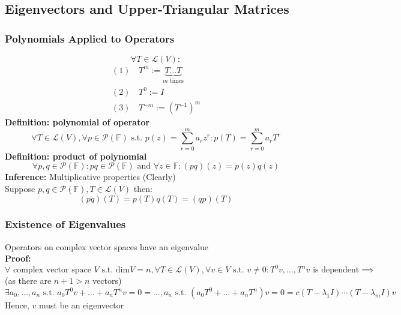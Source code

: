 \documentclass{article}
\newcommand{\F}{\mathbb{F}}
\newcommand{\st}{\mbox{ s.t. }}
\newcommand{\0}{{\bf{0}}}
\begin{document}
\subsection{Eigenvectors and Upper-Triangular Matrices}
\subsubsection{Polynomials Applied to Operators}
$$\forall T\in\mathcal{L}(V):$$
\begin{equation}
\begin{split}
    (1)\,&T^m:=\underbrace{T\dots T}_{m\mbox{ times}}\\
    (2)\,&T^0:=I\\
    (3)\,&T^{-m}:=(T^{-1})^m
\end{split}
\end{equation}
\textbf{Definition: polynomial of operator}
$$\forall T\in\mathcal{L}(V),\forall p\in\mathcal{P}(\F)\st p(z)=\sum_{r=0}^ma_rz^r:p(T)=\sum_{r=0}^ma_rT^r$$
\textbf{Definition: product of polynomial}
$$\forall p,q\in\mathcal{P}(\F):pq\in\mathcal{P}(\F)\mbox{ and }\forall z\in\F:(pq)(z)=p(z)q(z)$$
\textbf{Inference:} Multiplicative properties (Clearly)\\
Suppose $p,q\in\mathcal{P}(\F),T\in\mathcal{L}(V)$ then:
$$(pq)(T)=p(T)q(T)=(qp)(T)$$
\subsubsection{Existence of Eigenvalues}
Operators on complex vector spaces have an eigenvalue\\
\textbf{Proof:}
$$\forall\mbox{ complex vector space }V\st\mbox{dim}V=n,\forall T\in\mathcal{L}(V),\forall v\in V\st v\neq0:T^0v,\dots,T^nv\mbox{ is dependent}\implies$$
\null\hfill{(as there are $n+1>n$ vectors)}
$$\exists a_0,\dots,a_n\st a_0T^0v+\dots+a_nT^nv=0=\dots,a_n\st (a_0T^0+\dots+a_nT^n)v=0=c(T-\lambda_1I)\cdots(T-\lambda_mI)v$$
Hence, $v$ must be an eigenvector
\end{document}
